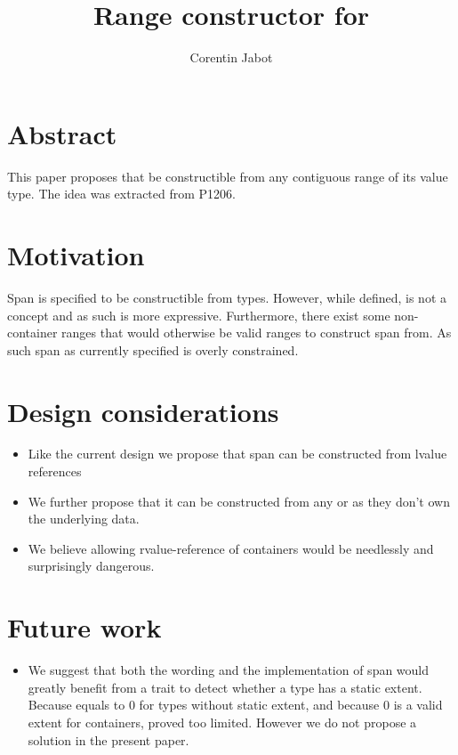 \documentclass{wg21}
\title{Range constructor for \tcode{std::span}}
\author{Corentin Jabot}{corentin.jabot@gmail.com}
\begin{document}
\maketitle

\section{Abstract}

This paper proposes that  be constructible from any contiguous range of its value type.
The idea was extracted from P1206. 


\section{Motivation}

Span is specified to be constructible from  types.
However, while defined,  is not a concept and as such  is more expressive.
Furthermore, there exist some non-container ranges that would otherwise be valid ranges to construct span from.
As such span as currently specified is overly constrained. 

\section{Design considerations}

\begin{itemize}
    \item Like the current design we propose that span can be constructed from lvalue references
    \item We further propose that it can be constructed from any  or  as they don't own the underlying data.
    \item We believe allowing rvalue-reference of containers would be needlessly and surprisingly dangerous.
\end{itemize}

\section{Future work}

\begin{itemize}
	\item We suggest that both the wording and the implementation of span would greatly benefit from a trait to detect whether a type has a static extent.
Because  equals to 0 for types without static extent, and because 0 is a valid extent for containers,  proved too limited. However we do not propose a solution in the present paper. 
\end{itemize}
\end{document}
